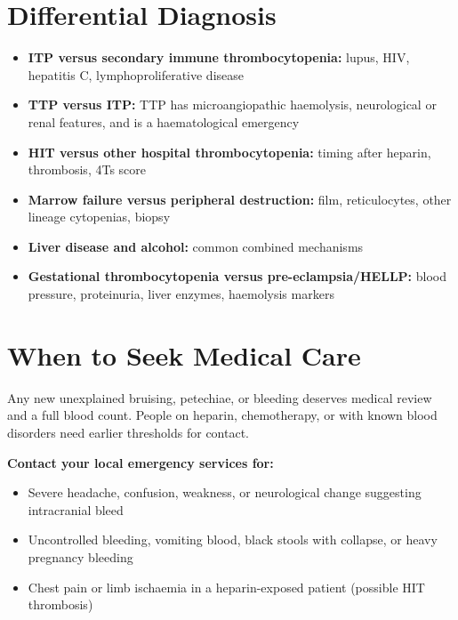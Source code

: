 \section*{Differential Diagnosis}
\begin{itemize}
    \item \textbf{ITP versus secondary immune thrombocytopenia:} lupus, HIV, hepatitis C, lymphoproliferative disease
    \item \textbf{TTP versus ITP:} TTP has microangiopathic haemolysis, neurological or renal features, and is a haematological emergency
    \item \textbf{HIT versus other hospital thrombocytopenia:} timing after heparin, thrombosis, 4Ts score
    \item \textbf{Marrow failure versus peripheral destruction:} film, reticulocytes, other lineage cytopenias, biopsy
    \item \textbf{Liver disease and alcohol:} common combined mechanisms
    \item \textbf{Gestational thrombocytopenia versus pre-eclampsia/HELLP:} blood pressure, proteinuria, liver enzymes, haemolysis markers
\end{itemize}

\section*{When to Seek Medical Care}
Any new unexplained bruising, petechiae, or bleeding deserves medical review and a full blood count. People on heparin, chemotherapy, or with known blood disorders need earlier thresholds for contact.

\textbf{Contact your local emergency services for:}
\begin{itemize}
    \item Severe headache, confusion, weakness, or neurological change suggesting intracranial bleed
    \item Uncontrolled bleeding, vomiting blood, black stools with collapse, or heavy pregnancy bleeding
    \item Chest pain or limb ischaemia in a heparin-exposed patient (possible HIT thrombosis)
\end{itemize}

